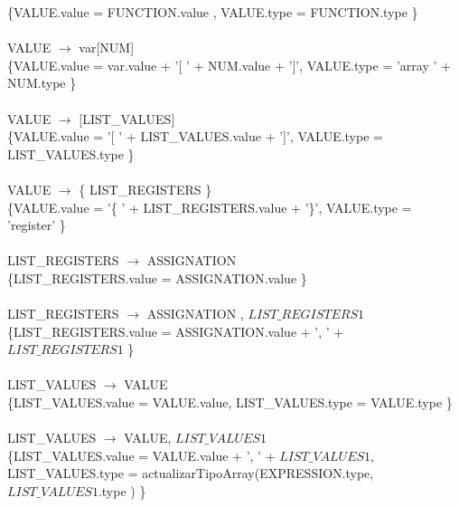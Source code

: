 \documentclass[10pt,a4paper]{article}
\begin{document}
{{{\{VALUE.value =  FUNCTION.value , VALUE.type = FUNCTION.type \}  \\ \\

VALUE $\rightarrow$ var[NUM]    \\

\{VALUE.value =  var.value + '[ ' + NUM.value + ']', VALUE.type = 'array ' + NUM.type \}  \\ \\


VALUE $\rightarrow$ [LIST\_VALUES]   \\

\{VALUE.value =  '[ ' + LIST\_VALUES.value + ']', VALUE.type = LIST\_VALUES.type \}  \\ \\

VALUE $\rightarrow$ \{ LIST\_REGISTERS \} \\

\{VALUE.value =  '\{ ' + LIST\_REGISTERS.value + '\}', VALUE.type = 'register' \}  \\ \\



LIST\_REGISTERS $\rightarrow$ ASSIGNATION  \\

\{LIST\_REGISTERS.value =  ASSIGNATION.value  \}  \\ \\

LIST\_REGISTERS $\rightarrow$ ASSIGNATION , $LIST\_REGISTERS{1}$ \\

\{LIST\_REGISTERS.value =  ASSIGNATION.value + ', ' + $LIST\_REGISTERS{1}$  \}  \\ \\



LIST\_VALUES $\rightarrow$ VALUE   \\

\{LIST\_VALUES.value =  VALUE.value, LIST\_VALUES.type = VALUE.type \}  \\ \\

LIST\_VALUES $\rightarrow$ VALUE, $LIST\_VALUES{1}$ \\

\{LIST\_VALUES.value =  VALUE.value + ', ' + $LIST\_VALUES{1}$, LIST\_VALUES.type = actualizarTipoArray(EXPRESSION.type, $LIST\_VALUES{1}$.type ) \}  \\ \\


}}}
\end{document}
